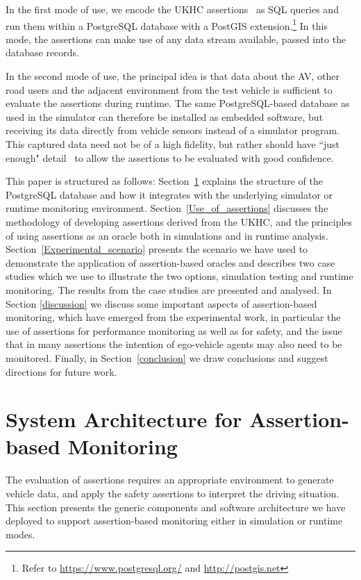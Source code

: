 In the first mode of use, we encode the UKHC assertions~\cite{highwayCode} as SQL queries and run them within a PostgreSQL database with a PostGIS extension.\footnote{Refer to  \url{https://www.postgresql.org/} and \url{http://postgis.net}} In this mode, the assertions can make use of any data stream available, passed into the database records.

In the second mode of use, the principal idea is that data about the AV, other road users and the adjacent environment from the test vehicle is sufficient to evaluate the assertions during runtime. The same PostgreSQL-based database as used in the simulator can therefore be installed as embedded software, but receiving its data directly from vehicle sensors instead of a simulator program. This captured data need not be of a high fidelity, but rather should have ``just enough" detail~\cite{Koopman2018} to allow the assertions to be evaluated with good confidence.

This paper is structured as follows: 
%
Section~\ref{generic_architecture} explains the structure of the PostgreSQL database and how it integrates with the underlying simulator or runtime monitoring environment. 
%
Section~\ref{Use_of_assertions} discusses the  methodology of developing assertions derived from the UKHC, and the principles of using  assertions as an oracle both in simulations and in runtime analysis. 
%
Section~\ref{Experimental_scenario} presents the scenario we have used to demonstrate the application of assertion-based oracles and describes two case studies which we use to illustrate the two options, simulation testing and runtime monitoring. The results from the case studies are presented and analysed. 
%
In Section \ref{discussion} we discuss some important aspects of assertion-based monitoring, which have emerged from the experimental work, in particular the use of assertions for performance monitoring as well as for safety, and the issue that in many assertions the intention of ego-vehicle agents may also need to be monitored. 
%
Finally, in Section~\ref{conclusion} we draw conclusions and suggest directions for future work.


\section{System Architecture for Assertion-based Monitoring} \label{generic_architecture}

The evaluation of assertions requires an appropriate environment to generate vehicle data, and apply the safety assertions to interpret the driving situation. This section presents the generic components and software architecture we have deployed to support assertion-based monitoring either in simulation or runtime modes.

